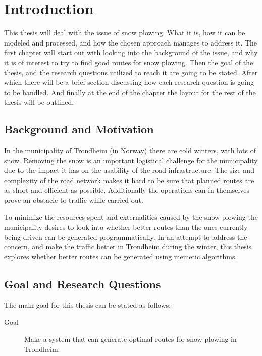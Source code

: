 \chapter{Introduction}
\label{cha:introduction}

This thesis will deal with the issue of snow plowing. What it is, how it can be modeled and processed, and how the chosen approach manages to address it. The first chapter will start out with looking into the background of the issue, and why it is of interest to try to find good routes for snow plowing. Then the goal of the thesis, and the research questions utilized to reach it are going to be stated. After which there will be a brief section discussing how each research question is going to be handled. And finally at the end of the chapter the layout for the rest of the thesis will be outlined.

\section{Background and Motivation}

In the municipality of Trondheim (in Norway) there are cold winters, with lots of snow. Removing the snow is an important logistical challenge for the municipality due to the impact it has on the usability of the road infrastructure. The size and complexity of the road network makes it hard to be sure that planned routes are as short and efficient as possible. Additionally the operations can in themselves prove an obstacle to traffic while carried out.

To minimize the resources spent and externalities caused by the snow plowing the municipality desires to look into whether better routes than the ones currently being driven can be generated programmatically. In an attempt to address the concern, and make the traffic better in Trondheim during the winter, this thesis explores whether better routes can be generated using memetic algorithms.

\section{Goal and Research Questions}
\label{sec:goal_and_research_questions}

The main goal for this thesis can be stated as follows:

\begin{description}
    \item [Goal] Make a system that can generate optimal routes for snow plowing in Trondheim.
\end{description}

